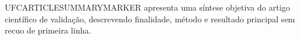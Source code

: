 UFCARTICLESUMMARYMARKER apresenta uma síntese objetiva do artigo científico de validação, descrevendo finalidade, método e resultado principal sem recuo de primeira linha.


